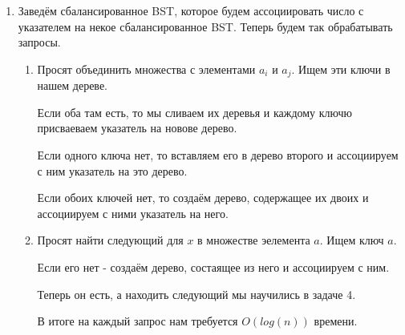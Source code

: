 \documentclass[a4paper,12pt]{article}
\begin{document}
\begin{enumerate}
\item Заведём сбалансированное BST, которое будем ассоциировать число с указателем на некое сбалансированное BST. Теперь будем так обрабатывать запросы.

\begin{enumerate}
\item Просят объединить множества с элементами $a_i$ и $a_j$. Ищем эти ключи в нашем дереве. 

Если оба там есть, то мы сливаем их деревья и каждому ключю присваеваем указатель на новове дерево.

Если одного ключа нет, то вставляем его в дерево второго и ассоциируем с ним указатель на это дерево.

Если обоих ключей нет, то создаём дерево, содержащее их двоих и ассоциируем с ними указатель на него.

\item Просят найти следующий для $x$ в множестве эелемента $a$. Ищем ключ $a$. 

Если его нет - создаём дерево, состаящее из него и ассоциируем с ним. 

Теперь он есть, а находить следующий мы научились в задаче 4.

В итоге на каждый запрос нам требуется $O(log(n))$ времени.
\end{enumerate}

\end{enumerate}
\end{document}
